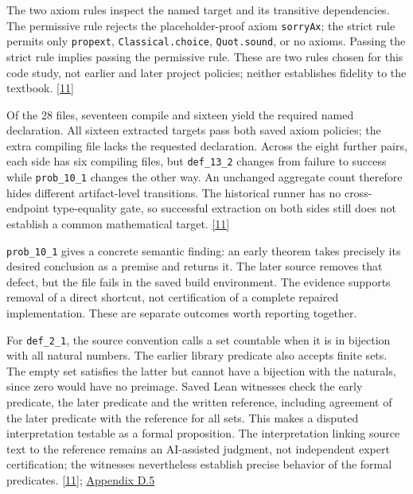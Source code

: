The two axiom rules inspect the named target and its transitive dependencies. The permissive rule rejects the placeholder-proof axiom \nolinkurl{sorryAx}; the strict rule permits only \nolinkurl{propext}, \nolinkurl{Classical.choice}, \nolinkurl{Quot.sound}, or no axioms. Passing the strict rule implies passing the permissive rule. These are two rules chosen for this code study, not earlier and later project policies; neither establishes fidelity to the textbook. \href{en.pdf\#ref-11}{\mbox{[11]}}

Of the 28 files, seventeen compile and sixteen yield the required named declaration. All sixteen extracted targets pass both saved axiom policies; the extra compiling file lacks the requested declaration. Across the eight further pairs, each side has six compiling files, but \nolinkurl{def_13_2} changes from failure to success while \nolinkurl{prob_10_1} changes the other way. An unchanged aggregate count therefore hides different artifact-level transitions. The historical runner has no cross-endpoint type-equality gate, so successful extraction on both sides still does not establish a common mathematical target. \href{en.pdf\#ref-11}{\mbox{[11]}}

\nolinkurl{prob_10_1} gives a concrete semantic finding: an early theorem takes precisely its desired conclusion as a premise and returns it. The later source removes that defect, but the file fails in the saved build environment. The evidence supports removal of a direct shortcut, not certification of a complete repaired implementation. These are separate outcomes worth reporting together.

For \nolinkurl{def_2_1}, the source convention calls a set countable when it is in bijection with all natural numbers. The earlier library predicate also accepts finite sets. The empty set satisfies the latter but cannot have a bijection with the naturals, since zero would have no preimage. Saved Lean witnesses check the early predicate, the later predicate and the written reference, including agreement of the later predicate with the reference for all sets. This makes a disputed interpretation testable as a formal proposition. The interpretation linking source text to the reference remains an AI-assisted judgment, not independent expert certification; the witnesses nevertheless establish precise behavior of the formal predicates. \href{en.pdf\#ref-11}{\mbox{[11]}}; \href{en-appendix.pdf\#d5}{Appendix D.5}

